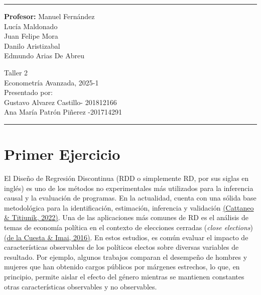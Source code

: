 \documentclass[a4paper, answers, addpoints, 11pt]{exam}
\begin{document}

\fancyhead[C]{}
\hrule \medskip 
\begin{minipage}{0.295\textwidth} 
\raggedright
\textbf{Profesor:} Manuel Fernández\\
\vspace{2mm}
Lucía Maldonado \\
Juan Felipe Mora \\
Danilo Aristizabal \\
Edmundo Arias De Abreu



\end{minipage}
\begin{minipage}{0.4\textwidth} 
\centering 
\huge 
Taller 2\\ 
\vspace{2mm}
\normalsize 
Econometría Avanzada, 2025-1\\ 
\vspace{2mm}
Presentado por: \\Gustavo Alvarez Castillo- 201812166\\
Ana María Patrón Piñerez -201714291

\end{minipage}

\medskip\hrule 
\bigskip

\section*{Primer Ejercicio}

El Diseño de Regresión Discontinua (RDD o simplemente RD, por sus siglas en inglés) es uno de los métodos no experimentales más utilizados para la inferencia causal y la evaluación de programas. En la actualidad, cuenta con una sólida base metodológica para la identificación, estimación, inferencia y validación \href{https://arxiv.org/abs/2108.09400}{(Cattaneo \& Titiunik, 2022)}. Una de las aplicaciones más comunes de RD es el análisis de temas de economía política en el contexto de elecciones cerradas (\textit{close elections}) \href{https://www.annualreviews.org/content/journals/10.1146/annurev-polisci-032015-010115}{(de la Cuesta \& Imai, 2016)}. En estos estudios, es común evaluar el impacto de características observables de los políticos electos sobre diversas variables de resultado. Por ejemplo, algunos trabajos comparan el desempeño de hombres y mujeres que han obtenido cargos públicos por márgenes estrechos, lo que, en principio, permite aislar el efecto del género mientras se mantienen constantes otras características observables y no observables. \\
\end{document}
